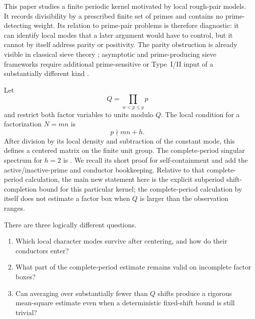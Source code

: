 \documentclass[11pt]{article}
\theoremstyle{definition}
\theoremstyle{remark}
\begin{document}
This paper studies a finite periodic kernel motivated by local rough-pair models.  It records divisibility by a prescribed finite set of primes and contains no prime-detecting weight.  Its relation to prime-pair problems is therefore diagnostic: it can identify local modes that a later argument would have to control, but it cannot by itself address parity or positivity.  The parity obstruction is already visible in classical sieve theory \citep{HeathBrown1982}; asymptotic and prime-producing sieve frameworks require additional prime-sensitive or Type~I/II input of a substantially different kind \citep{FriedlanderIwaniec1998,FordMaynard2024}.

Let
\[
 Q=\prod_{w<p\le y}p
\]
and restrict both factor variables to units modulo $Q$.  The local condition for a factorization $N=mn$ is
\[
 p\nmid mn+h.
\]
After division by its local density and subtraction of the constant mode, this defines a centered matrix on the finite unit group.  The complete-period singular spectrum for $h=2$ is \citet[Theorem~6.1]{WangRoughPairs2026}.  We recall its short proof for self-containment and add the active/inactive-prime and conductor bookkeeping.  Relative to that complete-period calculation, the main new statement here is the explicit subperiod shift-completion bound for this particular kernel; the complete-period calculation by itself does not estimate a factor box when $Q$ is larger than the observation ranges.

There are three logically different questions.
\begin{enumerate}[label=\textbf{Q\arabic*.},leftmargin=3.2em]
 \item Which local character modes survive after centering, and how do their conductors enter?
 \item What part of the complete-period estimate remains valid on incomplete factor boxes?
 \item Can averaging over substantially fewer than $Q$ shifts produce a rigorous mean-square estimate even when a deterministic fixed-shift bound is still trivial?
\end{enumerate}
\end{document}
